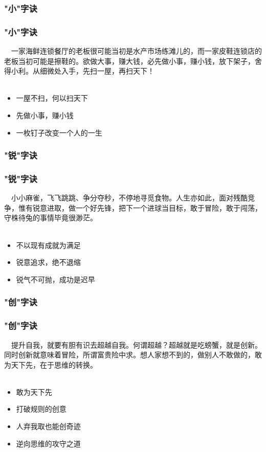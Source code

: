 \subsubsection{"小"字诀}
\begin{frame}
\frametitle{"小"字诀}
\noindent\handr~~一家海鲜连锁餐厅的老板很可能当初是水产市场练滩儿的，而一家皮鞋连锁店的老板当初可能是擦鞋的。欲做大事，赚大钱，必先做小事，赚小钱，放下架子，舍得小利。从细微处入手，先扫一屋，再扫天下！
~\\
~\\
\begin{itemize}
    \item 一屋不扫，何以扫天下
    \item 先做小事，赚小钱
    \item 一枚钉子改变一个人的一生
\end{itemize}
\end{frame}

\subsubsection{"锐"字诀}
\begin{frame}
\frametitle{"锐"字诀}
\noindent\handr~~小小麻雀，飞飞跳跳、争分夺秒，不停地寻觅食物。人生亦如此，面对残酷竞争，惟有锐意进取，做一个好先锋，把下一个进球当目标，敢于冒险，敢于闯荡，守株待兔的事情毕竟很渺茫。
~\\
~\\
\begin{itemize}
    \item 不以现有成就为满足
    \item 锐意追求，绝不退缩
    \item 锐气不可抛，成功是迟早
\end{itemize}
\end{frame}

\subsubsection{"创"字诀}
\begin{frame}
\frametitle{"创"字诀}
\noindent\handr~~提升自我，就要有胆有识去超越自我。何谓超越？超越就是吃螃蟹，就是创新。同时创新就意味着冒险，所谓富贵险中求。想人家想不到的，做别人不敢做的，敢为天下先，在于思维的转换。
~\\
~\\
\begin{itemize}
    \item 敢为天下先
    \item 打破规则的创意
    \item 人弃我取也能创奇迹
    \item 逆向思维的攻守之道
\end{itemize}
\end{frame}

